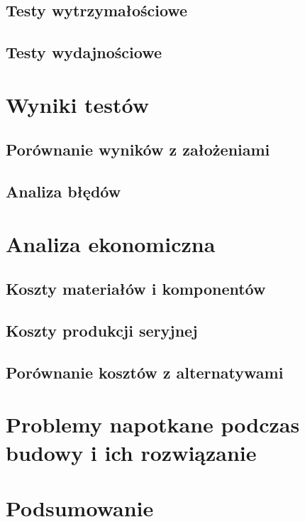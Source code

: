     \subsection{Testy wytrzymałościowe}
      \noindent\lipsum[4-7]

    \subsection{Testy wydajnościowe}
      \noindent\lipsum[8-10]

\clearpage\section{Wyniki testów}
  \noindent\lipsum[1-7]

    \subsection{Porównanie wyników z założeniami}
      \noindent\lipsum[1-3]

    \subsection{Analiza błędów}
      \noindent\lipsum[4-6]

\clearpage\section{Analiza ekonomiczna}  
  \noindent\lipsum[1-7]

  \subsection{Koszty materiałów i komponentów}
    \noindent\lipsum[1-3]

  \subsection{Koszty produkcji seryjnej}
    \noindent\lipsum[4-7]

  \subsection{Porównanie kosztów z alternatywami}
    \noindent\lipsum[8-10]

\clearpage\section{Problemy napotkane podczas budowy i ich rozwiązanie}
\noindent \lipsum[1]

\clearpage\section*{Podsumowanie}
    \noindent \lipsum[1-9]